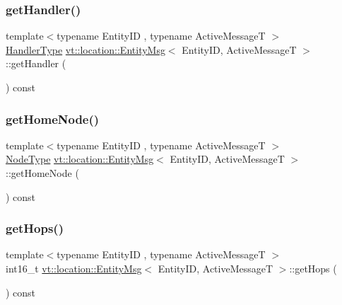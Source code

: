 \subsubsection{\texorpdfstring{get\+Handler()}{getHandler()}}
{\footnotesize\ttfamily template$<$typename Entity\+ID , typename Active\+MessageT $>$ \\
\hyperlink{namespacevt_af64846b57dfcaf104da3ef6967917573}{Handler\+Type} \hyperlink{structvt_1_1location_1_1_entity_msg}{vt\+::location\+::\+Entity\+Msg}$<$ Entity\+ID, Active\+MessageT $>$\+::get\+Handler (\begin{DoxyParamCaption}{ }\end{DoxyParamCaption}) const\hspace{0.3cm}{\ttfamily [inline]}}

\mbox{\label{structvt_1_1location_1_1_entity_msg_a5f0675e4fca11168fee86e8af122e289}} 
\subsubsection{\texorpdfstring{get\+Home\+Node()}{getHomeNode()}}
{\footnotesize\ttfamily template$<$typename Entity\+ID , typename Active\+MessageT $>$ \\
\hyperlink{namespacevt_a866da9d0efc19c0a1ce79e9e492f47e2}{Node\+Type} \hyperlink{structvt_1_1location_1_1_entity_msg}{vt\+::location\+::\+Entity\+Msg}$<$ Entity\+ID, Active\+MessageT $>$\+::get\+Home\+Node (\begin{DoxyParamCaption}{ }\end{DoxyParamCaption}) const\hspace{0.3cm}{\ttfamily [inline]}}

\mbox{\label{structvt_1_1location_1_1_entity_msg_a42198cb01c34983b7c46103cea721b9f}} 
\subsubsection{\texorpdfstring{get\+Hops()}{getHops()}}
{\footnotesize\ttfamily template$<$typename Entity\+ID , typename Active\+MessageT $>$ \\
int16\+\_\+t \hyperlink{structvt_1_1location_1_1_entity_msg}{vt\+::location\+::\+Entity\+Msg}$<$ Entity\+ID, Active\+MessageT $>$\+::get\+Hops (\begin{DoxyParamCaption}{ }\end{DoxyParamCaption}) const\hspace{0.3cm}{\ttfamily [inline]}}

